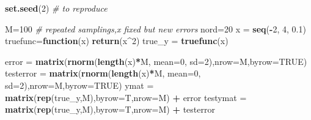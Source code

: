 \documentclass[]{article}
\newenvironment{Shaded}{\begin{snugshade}}{\end{snugshade}}
\newcommand{\CommentTok}[1]{\textcolor[rgb]{0.56,0.35,0.01}{\textit{#1}}}
\newcommand{\ControlFlowTok}[1]{\textcolor[rgb]{0.13,0.29,0.53}{\textbf{#1}}}
\newcommand{\DataTypeTok}[1]{\textcolor[rgb]{0.13,0.29,0.53}{#1}}
\newcommand{\DecValTok}[1]{\textcolor[rgb]{0.00,0.00,0.81}{#1}}
\newcommand{\FloatTok}[1]{\textcolor[rgb]{0.00,0.00,0.81}{#1}}
\newcommand{\KeywordTok}[1]{\textcolor[rgb]{0.13,0.29,0.53}{\textbf{#1}}}
\newcommand{\NormalTok}[1]{#1}
\newcommand{\OperatorTok}[1]{\textcolor[rgb]{0.81,0.36,0.00}{\textbf{#1}}}
\newcommand{\OtherTok}[1]{\textcolor[rgb]{0.56,0.35,0.01}{#1}}
\newcommand{\StringTok}[1]{\textcolor[rgb]{0.31,0.60,0.02}{#1}}
\begin{document}
\begin{Shaded}
\begin{Highlighting}[]
\KeywordTok{set.seed}\NormalTok{(}\DecValTok{2}\NormalTok{) }\CommentTok{# to reproduce}

\NormalTok{M=}\DecValTok{100} \CommentTok{# repeated samplings,x fixed but new errors}
\NormalTok{nord=}\DecValTok{20}
\NormalTok{x =}\StringTok{ }\KeywordTok{seq}\NormalTok{(}\OperatorTok{-}\DecValTok{2}\NormalTok{, }\DecValTok{4}\NormalTok{, }\FloatTok{0.1}\NormalTok{)}
\NormalTok{truefunc=}\ControlFlowTok{function}\NormalTok{(x) }\KeywordTok{return}\NormalTok{(x}\OperatorTok{^}\DecValTok{2}\NormalTok{)}
\NormalTok{true_y =}\StringTok{ }\KeywordTok{truefunc}\NormalTok{(x)}

\NormalTok{error =}\StringTok{ }\KeywordTok{matrix}\NormalTok{(}\KeywordTok{rnorm}\NormalTok{(}\KeywordTok{length}\NormalTok{(x)}\OperatorTok{*}\NormalTok{M, }\DataTypeTok{mean=}\DecValTok{0}\NormalTok{, }\DataTypeTok{sd=}\DecValTok{2}\NormalTok{),}\DataTypeTok{nrow=}\NormalTok{M,}\DataTypeTok{byrow=}\OtherTok{TRUE}\NormalTok{)}
\NormalTok{testerror =}\StringTok{ }\KeywordTok{matrix}\NormalTok{(}\KeywordTok{rnorm}\NormalTok{(}\KeywordTok{length}\NormalTok{(x)}\OperatorTok{*}\NormalTok{M, }\DataTypeTok{mean=}\DecValTok{0}\NormalTok{, }\DataTypeTok{sd=}\DecValTok{2}\NormalTok{),}\DataTypeTok{nrow=}\NormalTok{M,}\DataTypeTok{byrow=}\OtherTok{TRUE}\NormalTok{)}
\NormalTok{ymat =}\StringTok{ }\KeywordTok{matrix}\NormalTok{(}\KeywordTok{rep}\NormalTok{(true_y,M),}\DataTypeTok{byrow=}\NormalTok{T,}\DataTypeTok{nrow=}\NormalTok{M) }\OperatorTok{+}\StringTok{ }\NormalTok{error}
\NormalTok{testymat =}\StringTok{ }\KeywordTok{matrix}\NormalTok{(}\KeywordTok{rep}\NormalTok{(true_y,M),}\DataTypeTok{byrow=}\NormalTok{T,}\DataTypeTok{nrow=}\NormalTok{M) }\OperatorTok{+}\StringTok{ }\NormalTok{testerror}


\end{Highlighting}
\end{Shaded}
\end{document}
